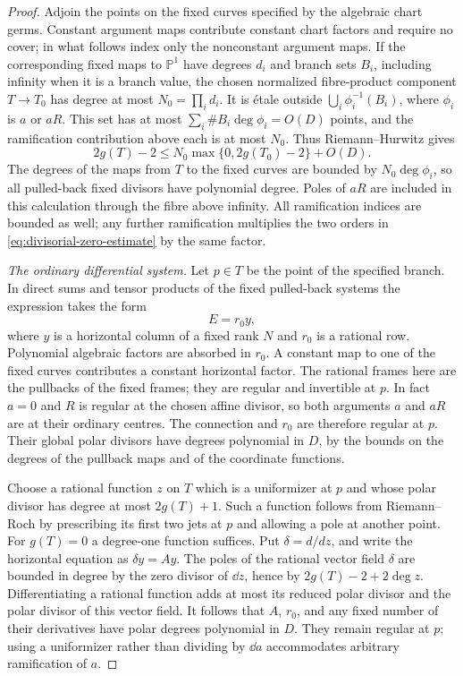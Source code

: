 \begin{proof}
Adjoin the points on the fixed curves specified by the algebraic chart
germs.  Constant argument maps contribute constant chart factors and
require no cover; in what follows index only the nonconstant argument
maps.  If the corresponding fixed maps to $\mathbb P^1$ have degrees $d_i$ and
branch sets $B_i$, including infinity when it is a branch value, the
chosen normalized fibre-product component $T\to T_0$ has degree at
most $N_0=\prod_i d_i$.  It is \'etale outside
$\bigcup_i\phi_i^{-1}(B_i)$, where $\phi_i$ is $a$ or $aR$.
This set has at most $\sum_i\#B_i\deg\phi_i=O(D)$ points, and the
ramification contribution above each is at most $N_0$.  Thus
Riemann--Hurwitz gives
\[
 2g(T)-2\leq N_0\max\{0,2g(T_0)-2\}+O(D).
\]
The degrees of the maps
from $T$ to the fixed curves are bounded by $N_0\deg\phi_i$, so all
pulled-back fixed divisors have polynomial degree.  Poles of $aR$ are
included in this calculation through the fibre above infinity.  All
ramification indices are bounded as well; any further ramification
multiplies the two orders in
\eqref{eq:divisorial-zero-estimate} by the same factor.

\emph{The ordinary differential system.}  Let $p\in T$ be the point of
the specified branch.  In direct sums and tensor products of the fixed
pulled-back systems the expression takes the form
\[
 E=r_0y,
\]
where $y$ is a horizontal column of a fixed rank $N$ and $r_0$ is a
rational row.  Polynomial algebraic factors are absorbed in $r_0$.
A constant map to one of the fixed curves contributes a constant
horizontal factor.  The rational frames here are the pullbacks of the
fixed frames; they are regular and invertible at $p$.  In fact $a=0$
and $R$ is regular at the chosen affine divisor, so both arguments
$a$ and $aR$ are at their ordinary centres.  The connection and $r_0$
are therefore regular at $p$.  Their global polar divisors have degrees
polynomial in $D$, by the bounds on the degrees of the pullback maps
and of the coordinate functions.

Choose a rational function $z$ on $T$ which is a uniformizer at $p$ and
whose polar divisor has degree at most $2g(T)+1$.  Such a function follows
from Riemann--Roch by prescribing its first two jets at $p$ and allowing
a pole at another point.  For $g(T)=0$ a degree-one function suffices.
Put $\delta=d/dz$, and write the horizontal equation as $\delta y=Ay$.
The poles of the rational vector field $\delta$ are bounded in degree by
the zero divisor of $\dd z$, hence by $2g(T)-2+2\deg z$.  Differentiating
a rational function adds at most its reduced polar divisor and the
polar divisor of this vector field.  It follows that $A$, $r_0$, and
any fixed number of their derivatives have polar degrees polynomial in
$D$.  They remain regular at $p$; using a uniformizer rather than
dividing by $\dd a$ accommodates arbitrary ramification of $a$.


\end{proof}
